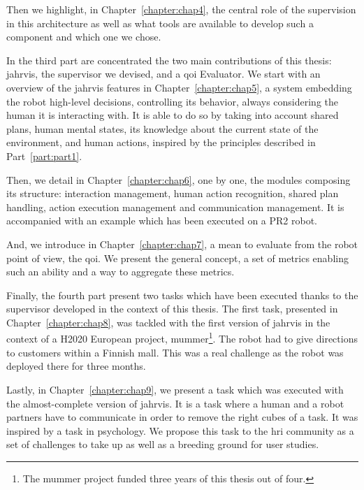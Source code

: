\documentclass[a4paper,11pt,twoside]{StyleThese}
\begin{document}
Then we highlight, in Chapter~\ref{chapter:chap4}, the central role of the supervision in this architecture as well as what tools are available to develop such a component and which one we chose.

\bigskip

In the third part are concentrated the two main contributions of this thesis: \acrfull{jahrvis}, the supervisor we devised, and a \acrfull{qoi} Evaluator. We start with an overview of the \acrshort{jahrvis} features in Chapter~\ref{chapter:chap5}, \ie a system embedding the robot high-level decisions, controlling its behavior, always considering the human it is interacting with. It is able to do so by taking into account shared plans, human mental states, its knowledge about the current state of the environment, and human actions, inspired by the principles described in Part~\ref{part:part1}. 

Then, we detail in Chapter~\ref{chapter:chap6}, one by one, the modules composing its structure: interaction management, human action recognition, shared plan handling, action execution management and communication management. It is accompanied with an example which has been executed on a PR2 robot. 

And, we introduce in Chapter~\ref{chapter:chap7}, a mean to evaluate from the robot point of view, the \acrlong{qoi}. We present the general concept, a set of metrics enabling such an ability and a way to aggregate these metrics. 

\bigskip

Finally, the fourth part present two tasks which have been executed thanks to the supervisor developed in the context of this thesis. The first task, presented in Chapter~\ref{chapter:chap8}, was tackled with the first version of \acrshort{jahrvis} in the context of a H2020 European project, \acrfull{mummer}\footnote{The \acrshort{mummer} project funded three years of this thesis out of four.}. The robot had to give directions to customers within a Finnish mall. This was a real challenge as the robot was deployed there for three months.

Lastly, in Chapter~\ref{chapter:chap9}, we present a task which was executed with the almost-complete version of \acrshort{jahrvis}. It is a task where a human and a robot partners have to communicate in order to remove the right cubes of a task. It was inspired by a task in psychology. We propose this task to the \acrshort{hri} community as a set of challenges to take up as well as a breeding ground for user studies.
\end{document}
